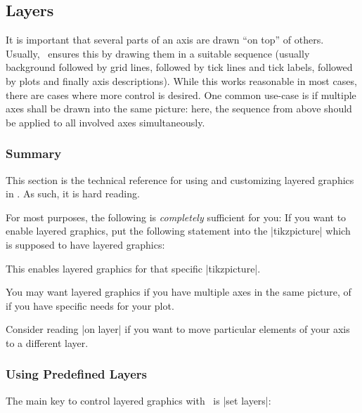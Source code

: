 \subsection{Layers}
{
%

It is important that several parts of an axis are drawn ``on top'' of others. Usually, \PGFPlots\ ensures this by drawing them in a suitable sequence (usually background followed by grid lines, followed by tick lines and tick labels, followed by plots and finally axis descriptions). While this works reasonable in most cases, there are cases where more control is desired. One common use-case is if multiple axes shall be drawn into the same picture: here, the sequence from above should be applied to all involved axes simultaneously. 

\subsubsection{Summary}
This section is the technical reference for using and customizing layered graphics in \PGFPlots. As such, it is hard reading.

For most purposes, the following is \emph{completely} sufficient for you: If you want to enable layered graphics, put the following statement into the |tikzpicture| which is supposed to have layered graphics:

\begin{codeexample}
\end{codeexample}
\noindent This enables layered graphics for that specific |tikzpicture|. 

You may want layered graphics if you have multiple axes in the same picture, of if you have specific needs for your plot.

Consider reading |on layer| if you want to move particular elements of your axis to a different layer.


\subsubsection{Using Predefined Layers}
The main key to control layered graphics with \PGFPlots\ is |set layers|:

}
